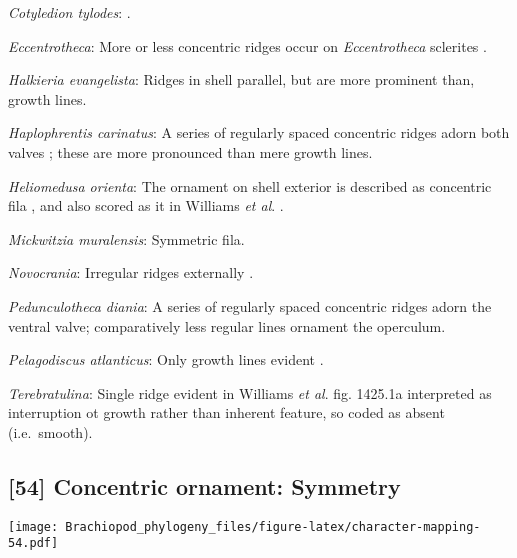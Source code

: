 \documentclass[openany]{book}
\theoremstyle{definition}
\theoremstyle{definition}
\theoremstyle{definition}
\theoremstyle{remark}
\begin{document}
\hypertarget{Cotyledion_tylodes-coding-53}{}
\emph{Cotyledion tylodes}: \citet{Zhang2013}.

\hypertarget{Eccentrotheca-coding-53}{}
\emph{Eccentrotheca}: More or less concentric ridges occur on
\emph{Eccentrotheca} sclerites
\citep{Skovsted2011Scleritomeconstruction}.

\hypertarget{Halkieria_evangelista-coding-53}{}
\emph{Halkieria evangelista}: Ridges in shell parallel, but are more
prominent than, growth lines.

\hypertarget{Haplophrentis_carinatus-coding-53}{}
\emph{Haplophrentis carinatus}: A series of regularly spaced concentric
ridges adorn both valves \citep{Moysiuk2017Hyolithsare}; these are more
pronounced than mere growth lines.

\hypertarget{Heliomedusa_orienta-coding-53}{}
\emph{Heliomedusa orienta}: The ornament on shell exterior is described
as concentric fila \citep[P.43]{Chen2007Reinterpretationof}, and also
scored as it in Williams \emph{et al}.
\citeyearpar[pp.160--163]{Williams2000LinguliformeaCraniiformea}.

\hypertarget{Mickwitzia_muralensis-coding-53}{}
\emph{Mickwitzia muralensis}: Symmetric fila.

\hypertarget{Novocrania-coding-53}{}
\emph{Novocrania}: Irregular ridges externally
\citep{Williams2000LinguliformeaCraniiformea}.

\hypertarget{Pedunculotheca_diania-coding-53}{}
\emph{Pedunculotheca diania}: A series of regularly spaced concentric
ridges adorn the ventral valve; comparatively less regular lines
ornament the operculum.

\hypertarget{Pelagodiscus_atlanticus-coding-53}{}
\emph{Pelagodiscus atlanticus}: Only growth lines evident
\citep{Williams2000LinguliformeaCraniiformea}.

\hypertarget{Terebratulina-coding-53}{}
\emph{Terebratulina}: Single ridge evident in Williams \emph{et al}.
\citeyearpar{Williams2006Rhynchonelliformeapart} fig. 1425.1a
interpreted as interruption ot growth rather than inherent feature, so
coded as absent (i.e.~smooth).

\subsection*{{[}54{]} Concentric ornament:
Symmetry}\label{concentric-ornament-symmetry}

\texttt{[image: Brachiopod\_phylogeny\_files/figure-latex/character-mapping-54.pdf]}
\end{document}
